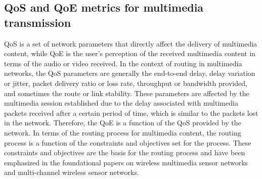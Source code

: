 \documentclass[12pt]{article}
\begin{document}
    \subsection{QoS and QoE metrics for multimedia transmission}
    QoS \cite{9074932}is a set of network parameters that directly affect the delivery of multimedia content, while QoE is the user’s perception of the received multimedia content in terms of the audio or video received. In the context of routing in multimedia networks, the QoS parameters are generally the end-to-end delay, delay variation or jitter, packet delivery ratio or loss rate, throughput or bandwidth provided, and sometimes the route or link stability. These parameters are affected by the multimedia session established due to the delay associated with multimedia packets received after a certain period of time, which is similar to the packets lost in the network. Therefore, the QoE is a function of the QoS provided by the network. In terms of the routing process for multimedia content, the routing process is a function of the constraints and objectives set for the process. These constraints and objectives are the basis for the routing process and have been emphasized in the foundational papers on wireless multimedia sensor networks and multi-channel wireless sensor networks.
\end{document}
